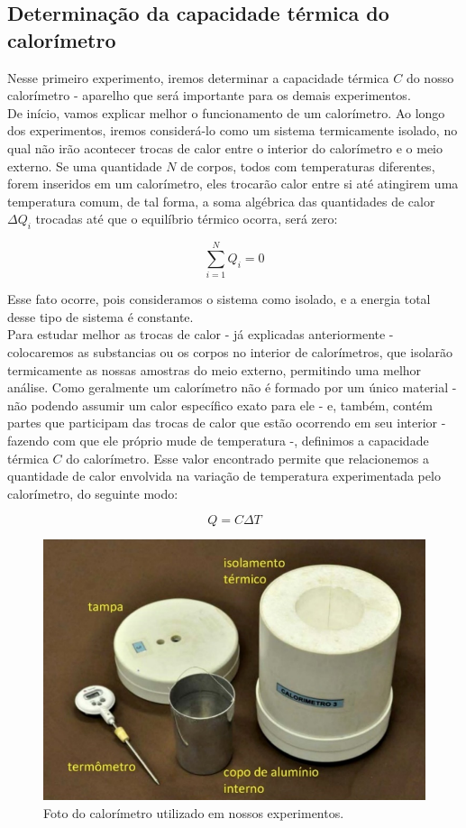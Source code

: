 \subsection{Determinação da capacidade térmica do calorímetro}

Nesse primeiro experimento, iremos determinar a capacidade térmica $C$ do nosso calorímetro - aparelho que será importante para os demais experimentos.\\

De início, vamos explicar melhor o funcionamento de um calorímetro. Ao longo dos experimentos, iremos considerá-lo como um sistema termicamente isolado, no qual não irão acontecer trocas de calor entre o interior do calorímetro e o meio externo. Se uma quantidade $N$ de corpos, todos com temperaturas diferentes, forem inseridos em um calorímetro, eles trocarão calor entre si até atingirem uma temperatura comum, de tal forma, a soma algébrica das quantidades de calor $\Delta Q_i$ trocadas até que o equilíbrio térmico ocorra, será zero:

\[ \sum_{i=1}^{N} Q_i = 0\]

Esse fato ocorre, pois consideramos o sistema como isolado, e a energia total desse tipo de sistema é constante.\\

Para estudar melhor as trocas de calor - já explicadas anteriormente - colocaremos as substancias ou os corpos no interior de calorímetros, que isolarão termicamente as nossas amostras do meio externo, permitindo uma melhor análise. Como geralmente um calorímetro não é formado por um único material - não podendo assumir um calor específico exato para ele - e, também, contém partes que participam das trocas de calor que estão ocorrendo em seu interior - fazendo com que ele próprio mude de temperatura -, definimos a capacidade térmica $C$ do calorímetro. Esse valor encontrado permite que relacionemos a quantidade de calor envolvida na variação de temperatura experimentada pelo calorímetro, do seguinte modo:

\[ Q = C \Delta T\]

\begin{figure}[H]
  \centering
  \includegraphics[scale=0.67]{images/calorimetro.png}
  \caption{Foto do calorímetro utilizado em nossos experimentos.}
\end{figure}

